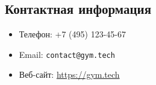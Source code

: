\documentclass[14pt, russian]{matmex-diploma-custom}
\begin{document}
\subsection*{Контактная информация}

\begin{itemize}[leftmargin=1.5em]
    \item Телефон: +7 (495) 123-45-67
    \item Email: \texttt{contact@gym.tech}
    \item Веб-сайт: \url{https://gym.tech}
\end{itemize}





\end{document}

